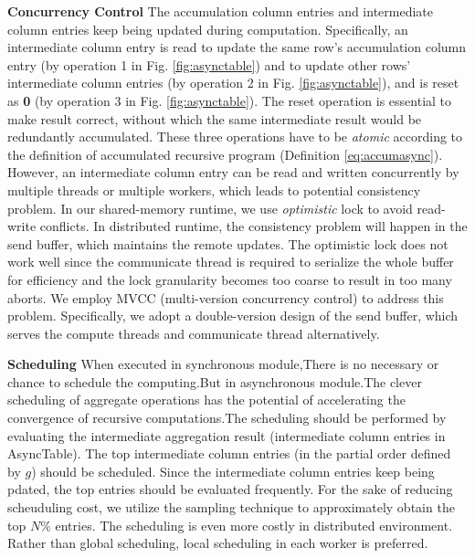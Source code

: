 \noindent\textbf{Concurrency Control}
The accumulation column entries and intermediate column entries keep being updated during computation. Specifically, an intermediate column entry is read to update the same row's accumulation column entry (by operation 1 in Fig. \ref{fig:asynctable}) and to update other rows' intermediate column entries (by operation 2 in Fig. \ref{fig:asynctable}), and is reset as \textbf{0} (by operation 3 in Fig. \ref{fig:asynctable}). The reset operation is essential to make result correct, without which the same intermediate result would be redundantly accumulated. These three operations have to be \emph{atomic} according to the definition of accumulated recursive program (Definition \ref{eq:accumasync}). However, an intermediate column entry can be read and written concurrently by multiple threads or multiple workers, which leads to potential consistency problem. In our shared-memory runtime, we use \emph{optimistic} lock to avoid read-write conflicts. In distributed runtime, the consistency problem will happen in the send buffer, which maintains the remote updates. The optimistic lock does not work well since the communicate thread is required to serialize the whole buffer for efficiency and the lock granularity becomes too coarse to result in too many aborts. We employ MVCC (multi-version concurrency control) to address this problem. Specifically, we adopt a double-version design of the send buffer, which serves the compute threads and communicate thread alternatively.


\noindent\textbf{Scheduling}
When executed in synchronous module,There is no necessary or chance to schedule the computing.But in asynchronous module.The clever scheduling of aggregate operations has the potential of accelerating the convergence of recursive computations.The scheduling should be performed by evaluating the intermediate aggregation result (intermediate column entries in AsyncTable). The top intermediate column entries (in the partial order defined by $g$) should be scheduled. Since the intermediate column entries keep being pdated, the top entries should be evaluated frequently. For the sake of reducing scheuduling cost, we utilize the sampling technique \cite{Zhang:2011:PDF:2038916.2038929} to approximately obtain the top $N\%$ entries. The scheduling is even more costly in distributed environment. Rather than global scheduling, local scheduling in each worker is preferred.

